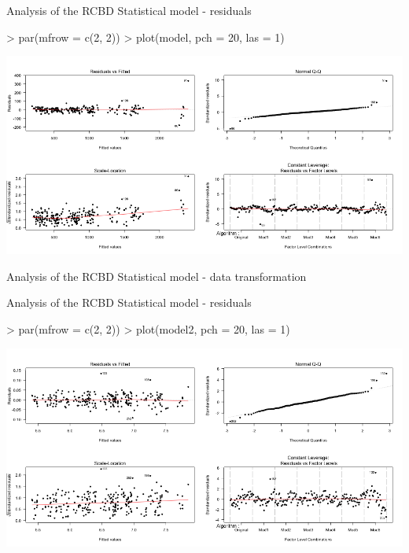 \documentclass[t]{beamer}
\begin{document}

\begin{ftstf}
{Analysis of the RCBD}
{Statistical model - residuals}
\begin{rcode}
> par(mfrow = c(2, 2))
> plot(model, pch = 20, las = 1)
\end{rcode}
\centering\includegraphics[width=\textwidth]{../figs/algo_res1.png}
\end{ftstf}


\begin{ftstf}
{Analysis of the RCBD}
{Statistical model - data transformation}
\end{ftstf}


\begin{ftstf}
{Analysis of the RCBD}
{Statistical model - residuals}
\begin{rcode}
> par(mfrow = c(2, 2))
> plot(model2, pch = 20, las = 1)
\end{rcode}
\centering\includegraphics[width=\textwidth]{../figs/algo_res2.png}
\end{ftstf}
\end{document}
